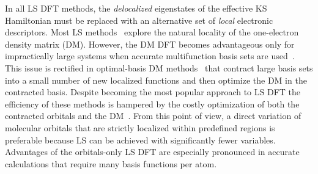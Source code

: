 \documentclass[aps,prl,reprint,amsmath,amssymb]{revtex4-1}
\begin{document}
In all LS DFT methods, the \emph{delocalized} eigenstates of the effective KS Hamiltonian must be replaced with an alternative set of \emph{local} electronic descriptors. 
Most LS methods~\cite{a:ls-rev-1999, a:ls-rev-2012, Kussmann2013, Aarons2016} explore the natural locality of the one-electron density matrix (DM). 
However, the DM DFT becomes advantageous only for impractically large systems when accurate multifunction basis sets are used~\cite{a:ls-dm-sign, Arita2014, a:ls-rev-2012, a:almo-ls}.
This issue is rectified in optimal-basis DM methods~\cite{Skylaris2005, Nakata2015, Mohr2015} that contract large basis sets into a small number of new localized functions and then optimize the DM in the contracted basis. 
Despite becoming the most popular approach to LS DFT the efficiency of these methods is hampered by the costly optimization of both the contracted orbitals and the DM~\cite{a:ls-onetep-2003}. 
%
From this point of view, a direct variation of molecular orbitals that are strictly localized within predefined regions is preferable because LS can be achieved with significantly fewer variables. 
Advantages of the orbitals-only LS DFT are especially pronounced in accurate calculations that require many basis functions per atom.
%
%
\end{document}
